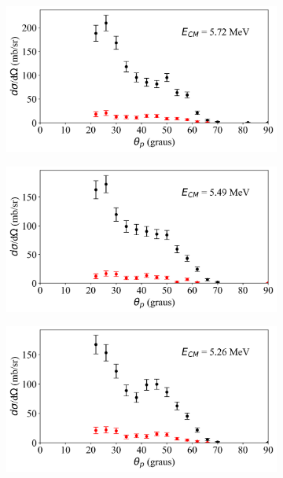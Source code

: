 \documentclass[a4paper,12pt,oneside]{book}
\begin{document}
\begin{figure}[H]
\begin{subfigure}[b]{0.49\textwidth}
        \caption{}
        \label{subfig:dist_ang_c}
    \end{subfigure}%
    \hfill
    \begin{subfigure}[b]{0.48\textwidth}
        \centering
        \includegraphics[scale=0.38, width=1.\columnwidth]{figs/dist_angs/dist_ang_3.png}
        \caption{}
        \label{subfig:dist_ang_d}
    \end{subfigure}
    \begin{subfigure}[b]{0.49\textwidth}
        \centering
        \includegraphics[scale=0.38, width=1.\columnwidth]{figs/dist_angs/dist_ang_4.png}
        \caption{}
        \label{subfig:dist_ang_e}
    \end{subfigure}%
    \hfill
    \begin{subfigure}[b]{0.48\textwidth}
        \centering
        \includegraphics[scale=0.38, width=1.\columnwidth]{figs/dist_angs/dist_ang_5.png}

\end{subfigure}
\end{figure}
\end{document}
